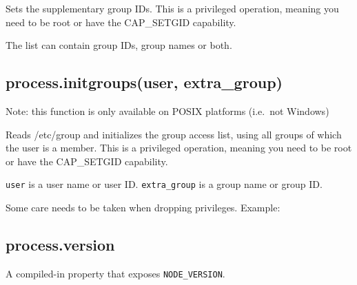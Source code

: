Sets the supplementary group IDs. This is a privileged operation,
meaning you need to be root or have the CAP\_SETGID capability.

The list can contain group IDs, group names or both.

\subsection{process.initgroups(user, extra\_group)}

Note: this function is only available on POSIX platforms (i.e.~not
Windows)

Reads /etc/group and initializes the group access list, using all groups
of which the user is a member. This is a privileged operation, meaning
you need to be root or have the CAP\_SETGID capability.

\texttt{user} is a user name or user ID. \texttt{extra\_group} is a
group name or group ID.

Some care needs to be taken when dropping privileges. Example:

\begin{Shaded}
\begin{Highlighting}[]
\NormalTok{(}\NormalTok{());         }\CommentTok{// [ 0 ]}
\NormalTok{(}\NormalTok{, }\NormalTok{);   }
\NormalTok{(}\NormalTok{());         }\CommentTok{// [ 27, 30, 46, 1000, 0 ]}
\NormalTok{(}\NormalTok{);                     }
\NormalTok{(}\NormalTok{());         }\CommentTok{// [ 27, 30, 46, 1000 ]}
\end{Highlighting}
\end{Shaded}

\subsection{process.version}

A compiled-in property that exposes \texttt{NODE\_VERSION}.

\begin{Shaded}
\begin{Highlighting}[]
\NormalTok{(} \NormalTok{+ }\NormalTok{);}
\end{Highlighting}
\end{Shaded}

